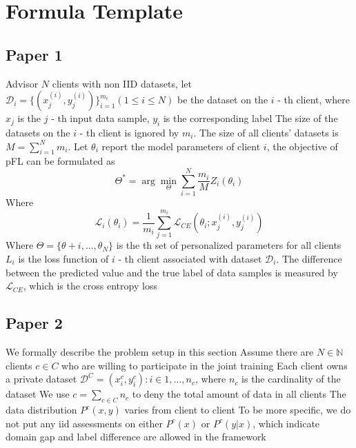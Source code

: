 \section{Formula Template}
\subsection{Paper 1}
Advisor $N$ clients with non IID datasets, let $\mathcal{D}_i=\{(x_j^{(i)},y_j^{(i)})\}_{i=1}^{m_i}(1\leq i\leq N)$ be the dataset on the $i$ - th client, where $x_j$ is the $j$ - th input data sample, $y_i$ is the corresponding label The size of the datasets on the $i$ - th client is ignored by $m_i$. The size of all clients' datasets is $M=\sum_{i=1}^N m_i$. Let $\theta_i$ report the model parameters of client $i$, the objective of pFL can be formulated as
\begin{equation*}
    \Theta^{*}=\arg\operatorname*{\min}_{\Theta}\sum_{i=1}^{N}\frac{m_{i}}{M}Z_{i}(\theta_{i})
\end{equation*}
Where
\begin{equation*}
    \mathcal{L}_i(\theta_i)=\frac1{m_i}\sum_{j=1}^{m_i}\mathcal{L}_{CE}(\theta_i;x_j^{(i)},y_j^{(i)})
\end{equation*}
Where $\Theta=\{\theta+i,\ldots,\theta_N\}$ is the th set of personalized parameters for all clients $L_i$ is the loss function of $i$ - th client associated with dataset $\mathcal{D}_i$. The difference between the predicted value and the true label of data samples is measured by $\mathcal{L}_{CE}$, which is the cross entropy loss
\subsection{Paper 2}
We formally describe the problem setup in this section Assume there are $N\in\mathbb{N}$ clients $c\in C$ who are willing to participate in the joint training Each client owns a private dataset $\mathcal{D}^C = {(x_i^c, y_i^c) : i\in{1,\ldots,n_c}}$, where $n_c$ is the cardinality of the dataset We use $c=\sum_{c\in C}n_c$ to deny the total amount of data in all clients The data distribution $P^c(x, y)$ varies from client to client To be more specific, we do not put any \acs{iid} assessments on either $P^c(x)$ or $P^c(y|x)$, which indicate domain gap and label difference are allowed in the framework
